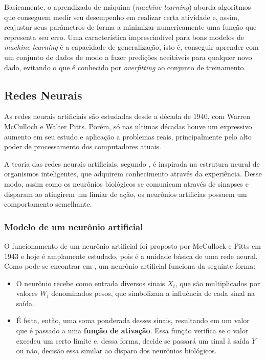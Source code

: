 \documentclass[a4paper,12pt]{article}
\begin{document}
Basicamente, o aprendizado de máquina (\textit{machine learning}) aborda algoritmos que conseguem medir seu desempenho em realizar certa atividade e, assim, reajustar seus parâmetros de forma a minimizar numericamente uma função que representa seu erro. Uma característica imprescindível para bons modelos de \textit{machine learning} é a capacidade de generalização, isto é, conseguir aprender com um conjunto de dados de modo a fazer predições aceitáveis para qualquer novo dado, evitando o que é conhecido por \textit{overfitting} ao conjunto de treinamento.  

\subsection{Redes Neurais}
As redes neurais artificiais são estudadas desde a década de 1940, com  Warren McCulloch e Walter Pitts. Porém, só nas ultimas décadas houve um expressivo aumento em seu estudo e aplicação a problemas reais, principalmente pelo alto poder de processamento dos computadores atuais.

A teoria das redes neurais artificiais, segundo \cite{linkUSP}, é inspirada na estrutura neural de organismos inteligentes, que adquirem conhecimento através da experiência. Desse modo, assim como os neurônios biológicos se comunicam através de sinapses e disparam ao atingirem um limiar de ação, os neurônios artificias possuem um comportamento semelhante.

\subsubsection{Modelo de um neurônio artificial}

O funcionamento de um neurônio artificial foi proposto por McCullock e Pitts em 1943 e hoje é amplamente estudado, pois é a unidade básica de uma rede neural. Como pode-se encontrar em \cite{linkUSP}, um neurônio artificial funciona da seguinte forma: 
\begin{itemize}
\item O neurônio recebe como entrada diversos sinais $X_i$, que são multiplicados por valores $W_i$ denominados pesos, que simbolizam a influência de cada sinal na saída.
\item É feita, então, uma soma ponderada desses sinais, resultando em um valor que é passado a uma \textbf{função de ativação}. Essa função verifica se o valor excedeu um certo limite e, dessa forma, decide se passará um sinal à saída $Y$ ou não, decisão essa similar ao disparo dos neurônios biológicos.
\end{itemize}
\end{document}

